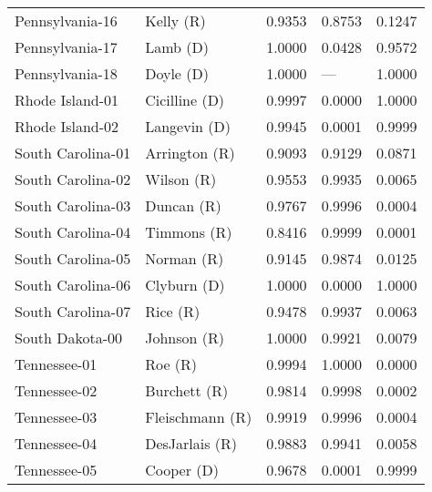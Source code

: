 \begin{longtable}{llrll}
   Pennsylvania-16 &             {\color{Red} Kelly (R)} &       0.9353 &        0.8753 &        0.1247 \\
   Pennsylvania-17 &             {\color{Blue} Lamb (D)} &       1.0000 &        0.0428 &        0.9572 \\
   Pennsylvania-18 &            {\color{Blue} Doyle (D)} &       1.0000 &           --- &        1.0000 \\
   Rhode Island-01 &        {\color{Blue} Cicilline (D)} &       0.9997 &        0.0000 &        1.0000 \\
   Rhode Island-02 &         {\color{Blue} Langevin (D)} &       0.9945 &        0.0001 &        0.9999 \\
 South Carolina-01 &         {\color{Red} Arrington (R)} &       0.9093 &        0.9129 &        0.0871 \\
 South Carolina-02 &            {\color{Red} Wilson (R)} &       0.9553 &        0.9935 &        0.0065 \\
 South Carolina-03 &            {\color{Red} Duncan (R)} &       0.9767 &        0.9996 &        0.0004 \\
 South Carolina-04 &           {\color{Red} Timmons (R)} &       0.8416 &        0.9999 &        0.0001 \\
 South Carolina-05 &            {\color{Red} Norman (R)} &       0.9145 &        0.9874 &        0.0125 \\
 South Carolina-06 &          {\color{Blue} Clyburn (D)} &       1.0000 &        0.0000 &        1.0000 \\
 South Carolina-07 &              {\color{Red} Rice (R)} &       0.9478 &        0.9937 &        0.0063 \\
   South Dakota-00 &           {\color{Red} Johnson (R)} &       1.0000 &        0.9921 &        0.0079 \\
      Tennessee-01 &               {\color{Red} Roe (R)} &       0.9994 &        1.0000 &        0.0000 \\
      Tennessee-02 &          {\color{Red} Burchett (R)} &       0.9814 &        0.9998 &        0.0002 \\
      Tennessee-03 &       {\color{Red} Fleischmann (R)} &       0.9919 &        0.9996 &        0.0004 \\
      Tennessee-04 &        {\color{Red} DesJarlais (R)} &       0.9883 &        0.9941 &        0.0058 \\
      Tennessee-05 &           {\color{Blue} Cooper (D)} &       0.9678 &        0.0001 &        0.9999 \\

\end{longtable}
